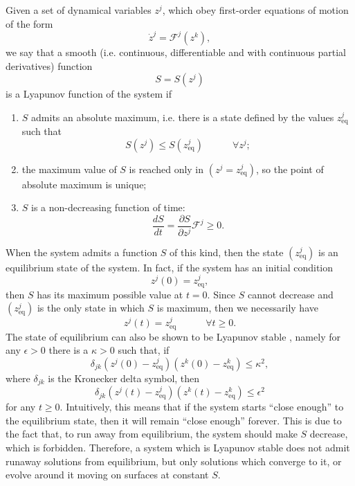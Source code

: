 \documentclass[a4paper, amsfonts, amssymb, amsmath, reprint, showkeys, nofootinbib, twoside]{revtex4-1}
\newcommand{\spc}{\quad \quad \quad}
\begin{document}
Given a set of dynamical variables $z^j$, which obey first-order equations of motion of the form
\begin{equation}
\dot{z}^j = \mathcal{F}^j(z^k),
\end{equation}
we say that a smooth (i.e. continuous, differentiable and with continuous partial derivatives) function 
\begin{equation}
S=S(z^j)
\end{equation}
is a Lyapunov function of the system if
%
\begin{enumerate}[label=(\roman*)]
%
\item $S$ admits an absolute maximum, i.e. there is a state defined by the values $z_{\text{eq}}^j$ such that 
\begin{equation}
S(z^j) \leq S (z_{\text{eq}}^j)  \spc \forall z^j ;
\end{equation} 
\item the maximum value of $S$ is reached only in $(z^j = z_{\text{eq}}^j)$, so the point of absolute maximum is unique;
\item $S$ is a non-decreasing function of time:
\begin{equation}
\dfrac{dS}{dt}= \dfrac{\partial S}{\partial z^j} \mathcal{F}^j \geq 0.
\end{equation}
%
\end{enumerate}
%
When the system admits a function $S$ of this kind, then the state $(z_{\text{eq}}^j)$ is an equilibrium state of the system. In fact, if the system has an initial condition
\begin{equation}
z^j(0) = z_{\text{eq}}^j,
\end{equation}
then $S$ has its maximum possible value at $t=0$. Since $S$ cannot decrease and $(z_{\text{eq}}^j)$ is the only state in which $S$ is maximum, then we necessarily have
\begin{equation}
z^j(t) = z_{\text{eq}}^j  \spc \forall t \geq 0.
\end{equation}
The state of equilibrium can also be shown to be Lyapunov stable \citep{lasalle1961stability}, namely for any $\epsilon>0$ there is a $\kappa >0$ such that, if
\begin{equation}
\delta_{jk} (z^j(0)-z_{\text{eq}}^j)(z^k(0)-z_{\text{eq}}^k) \leq \kappa^2,
\end{equation}
where $\delta_{jk}$ is the Kronecker delta symbol, then
\begin{equation}
\delta_{jk} (z^j(t)-z_{\text{eq}}^j)(z^k(t)-z_{\text{eq}}^k) \leq \epsilon^2
\end{equation}
for any $t \geq 0$. Intuitively, this means that if the system starts ``close enough'' to the equilibrium state, then it will remain ``close enough'' forever. This is due to the fact that, to run away from equilibrium, the system should make $S$ decrease, which is forbidden. Therefore, a system which is Lyapunov stable does not admit runaway solutions from equilibrium, but only solutions which converge to it, or evolve around it moving on surfaces at constant $S$.
\end{document}
